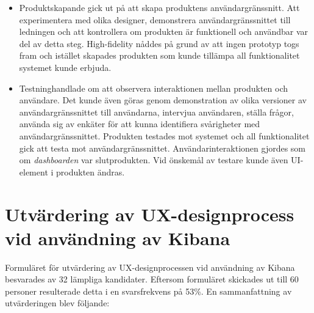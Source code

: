\documentclass[12pt]{kththesis}
\begin{document}
\begin{itemize}
\item Produktskapande gick ut på att skapa produktens användargränssnitt. Att experimentera med olika designer, demonstrera användargränssnittet till ledningen och att kontrollera om produkten är funktionell och användbar var del av detta steg. High-fidelity nåddes på grund av att ingen prototyp togs fram och istället skapades produkten som kunde tillämpa all funktionalitet systemet kunde erbjuda.
\item Testninghandlade om att observera interaktionen mellan produkten och användare. Det kunde även göras genom demonstration av olika versioner av användargränssnittet till användarna, intervjua användaren, ställa frågor, använda sig av enkäter för att kunna identifiera svårigheter med användargränssnittet. Produkten testades mot systemet och all funktionalitet gick att testa mot användargränssnittet. Användarinteraktionen gjordes som om \textit{dashboarden} var slutprodukten. Vid önskemål av testare kunde även UI-element i produkten ändras. 
\end{itemize}

\section{Utvärdering av UX-designprocess vid användning av Kibana}
Formuläret för utvärdering av UX-designprocessen vid användning av Kibana besvarades av 32 lämpliga kandidater. Eftersom formuläret skickades ut till 60 personer resulterade detta i en svarsfrekvens på 53\%. En sammanfattning av utvärderingen blev följande:
\end{document}
